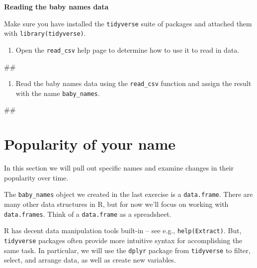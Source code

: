 \documentclass[]{book}
\newenvironment{Shaded}{\begin{snugshade}}{\end{snugshade}}
\newcommand{\NormalTok}[1]{#1}
\providecommand{\tightlist}{%
  \setlength{\itemsep}{0pt}\setlength{\parskip}{0pt}}
\begin{document}
\textbf{Reading the baby names data}

Make sure you have installed the \texttt{tidyverse} suite of packages
and attached them with \texttt{library(tidyverse)}.

\begin{enumerate}
\def\labelenumi{\arabic{enumi}.}
\tightlist
\item
  Open the \texttt{read\_csv} help page to determine how to use it to
  read in data.
\end{enumerate}

\begin{Shaded}
\begin{Highlighting}[]
\NormalTok{##}
\end{Highlighting}
\end{Shaded}

\begin{enumerate}
\def\labelenumi{\arabic{enumi}.}
\setcounter{enumi}{1}
\tightlist
\item
  Read the baby names data using the \texttt{read\_csv} function and
  assign the result with the name \texttt{baby\_names}.
\end{enumerate}

\begin{Shaded}
\begin{Highlighting}[]
\NormalTok{##}
\end{Highlighting}
\end{Shaded}

\section{Popularity of your name}\label{popularity-of-your-name}

In this section we will pull out specific names and examine changes in
their popularity over time.

The \texttt{baby\_names} object we created in the last exercise is a
\texttt{data.frame}. There are many other data structures in R, but for
now we'll focus on working with \texttt{data.frames}. Think of a
\texttt{data.frame} as a spreadsheet.

R has decent data manipulation tools built-in -- see e.g.,
\texttt{help(Extract)}. But, \texttt{tidyverse} packages often provide
more intuitive syntax for accomplishing the same task. In particular, we
will use the \texttt{dplyr} package from \texttt{tidyverse} to filter,
select, and arrange data, as well as create new variables.
\end{document}
